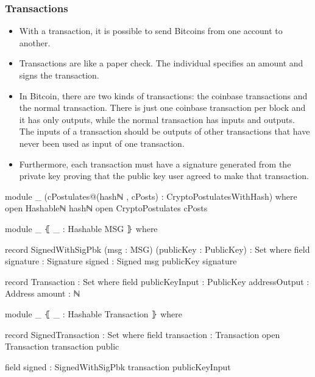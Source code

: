 \documentclass{beamer}
\begin{document}
\begin{frame}
   \frametitle{Transactions}
   \begin{itemize}[<+->]
     \item With a transaction, it is possible to send Bitcoins from one account to another.
     \item Transactions are like a paper check. The individual specifies an amount and signs the transaction.
     \item In Bitcoin, there are two kinds of transactions:
       the coinbase transactions and the normal transaction.
       There is just one coinbase transaction per block and it has only outputs,
       while the normal transaction has inputs and outputs.
       The inputs of a transaction should be outputs of other transactions that have never been used as input of one transaction.
    \item Furthermore, each transaction must have a signature generated from the private key proving that the public key user agreed to make that transaction.
   \end{itemize}
\end{frame}

\begin{frame}
\begin{code}

module _ (cPostulates@(hashℕ , cPosts) : CryptoPostulatesWithHash) where
  open Hashableℕ hashℕ
  open CryptoPostulates cPosts

  module _ ⦃ _ : Hashable MSG ⦄ where

    record SignedWithSigPbk  (msg : MSG) (publicKey : PublicKey) : Set where
      field
        signature : Signature
        signed    : Signed msg publicKey signature

  record Transaction : Set where
    field
      publicKeyInput : PublicKey
      addressOutput  : Address
      amount         : ℕ

\end{code}
\end{frame}

\begin{frame}
\begin{code}

  module _ ⦃ _ : Hashable Transaction ⦄ where

    record SignedTransaction  : Set where
      field
        transaction : Transaction
      open Transaction transaction public

      field
        signed : SignedWithSigPbk transaction publicKeyInput

\end{code}
\end{frame}
\end{document}
